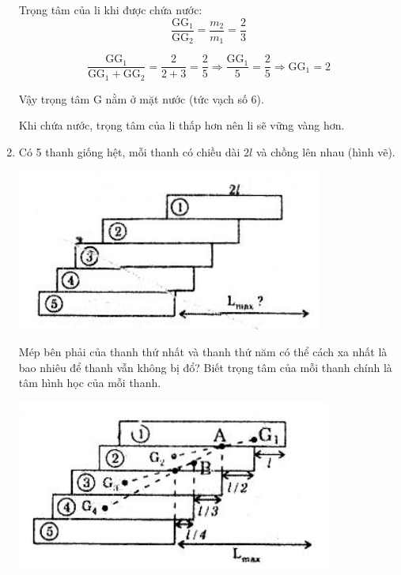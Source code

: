 \begin{enumerate}[label=\bfseries Câu \arabic*:]
	\loigiai
	{Trọng tâm của li khi được chứa nước:
		$$\dfrac{\text{GG}_1}{\text{GG}_2} = \dfrac{m_2}{m_1} = \dfrac{2}{3}$$
		
		$$\dfrac{\text{GG}_1}{\text{GG}_1 + \text{GG}_2} = \dfrac{2}{2+3} = \dfrac{2}{5} \Rightarrow \dfrac{\text{GG}_1}{5} = \dfrac{2}{5} \Rightarrow \text{GG}_1 = 2$$
		
		Vậy trọng tâm G nằm ở mặt nước (tức vạch số 6).
		
		Khi chứa nước, trọng tâm của li thấp hơn nên li sẽ vững vàng hơn.
	}
	\item {}
	
	\cauhoi
	{Có 5 thanh giống hệt, mỗi thanh có chiều dài $2l$ và chồng lên nhau (hình vẽ).
		\begin{center}
			\includegraphics[scale=1.2]{../figs/VN10-2021-PH-TP023-1.png}
		\end{center}
	Mép bên phải của thanh thứ nhất và thanh thứ năm có thể cách xa nhất là bao nhiêu để thanh vẫn không bị đổ? Biết trọng tâm của mỗi thanh chính là tâm hình học của mỗi thanh.
	}
	
	\loigiai
	{		\begin{center}
			\includegraphics[scale=1.2]{../figs/VN10-2021-PH-TP023-2.png}
		\end{center}
	
}
\end{enumerate}
